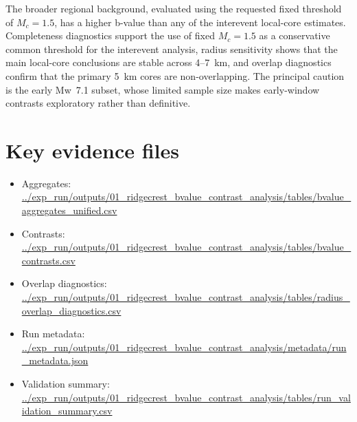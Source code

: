 \documentclass[11pt]{article}
\begin{document}
The broader regional background, evaluated using the requested fixed threshold of $M_c=1.5$, has a higher b-value than any of the interevent local-core estimates. Completeness diagnostics support the use of fixed $M_c=1.5$ as a conservative common threshold for the interevent analysis, radius sensitivity shows that the main local-core conclusions are stable across 4--7~km, and overlap diagnostics confirm that the primary 5~km cores are non-overlapping. The principal caution is the early Mw~7.1 subset, whose limited sample size makes early-window contrasts exploratory rather than definitive.

\section*{Key evidence files}
\begin{itemize}
    \item Aggregates: \url{../exp_run/outputs/01_ridgecrest_bvalue_contrast_analysis/tables/bvalue_aggregates_unified.csv}
    \item Contrasts: \url{../exp_run/outputs/01_ridgecrest_bvalue_contrast_analysis/tables/bvalue_contrasts.csv}
    \item Overlap diagnostics: \url{../exp_run/outputs/01_ridgecrest_bvalue_contrast_analysis/tables/radius_overlap_diagnostics.csv}
    \item Run metadata: \url{../exp_run/outputs/01_ridgecrest_bvalue_contrast_analysis/metadata/run_metadata.json}
    \item Validation summary: \url{../exp_run/outputs/01_ridgecrest_bvalue_contrast_analysis/tables/run_validation_summary.csv}
\end{itemize}
\end{document}

